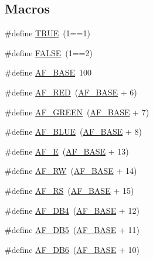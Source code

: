 \subsection*{Macros}
\begin{DoxyCompactItemize}
\item 
\#define \hyperlink{lcd-adafruit_8c_aa8cecfc5c5c054d2875c03e77b7be15d}{T\-R\-U\-E}~(1==1)
\item 
\#define \hyperlink{lcd-adafruit_8c_aa93f0eb578d23995850d61f7d61c55c1}{F\-A\-L\-S\-E}~(1==2)
\item 
\#define \hyperlink{lcd-adafruit_8c_a710181a64fa5dc36dc1ae8186ec077d0}{A\-F\-\_\-\-B\-A\-S\-E}~100
\item 
\#define \hyperlink{lcd-adafruit_8c_a10a331aef88d563a44fc3aca87f67647}{A\-F\-\_\-\-R\-E\-D}~(\hyperlink{lcd-adafruit_8c_a710181a64fa5dc36dc1ae8186ec077d0}{A\-F\-\_\-\-B\-A\-S\-E} + 6)
\item 
\#define \hyperlink{lcd-adafruit_8c_aaf16866710cceb823bc3dd84cd129e5c}{A\-F\-\_\-\-G\-R\-E\-E\-N}~(\hyperlink{lcd-adafruit_8c_a710181a64fa5dc36dc1ae8186ec077d0}{A\-F\-\_\-\-B\-A\-S\-E} + 7)
\item 
\#define \hyperlink{lcd-adafruit_8c_adb7d66e4f10afe077d8eac4be1cb6321}{A\-F\-\_\-\-B\-L\-U\-E}~(\hyperlink{lcd-adafruit_8c_a710181a64fa5dc36dc1ae8186ec077d0}{A\-F\-\_\-\-B\-A\-S\-E} + 8)
\item 
\#define \hyperlink{lcd-adafruit_8c_a7ef1bf47776cd36bfc3a713ee3d1496a}{A\-F\-\_\-\-E}~(\hyperlink{lcd-adafruit_8c_a710181a64fa5dc36dc1ae8186ec077d0}{A\-F\-\_\-\-B\-A\-S\-E} + 13)
\item 
\#define \hyperlink{lcd-adafruit_8c_adb58df064577c4a49af6bf042ac453d2}{A\-F\-\_\-\-R\-W}~(\hyperlink{lcd-adafruit_8c_a710181a64fa5dc36dc1ae8186ec077d0}{A\-F\-\_\-\-B\-A\-S\-E} + 14)
\item 
\#define \hyperlink{lcd-adafruit_8c_a4fb727ea18cfec6c573568e7ebf11e97}{A\-F\-\_\-\-R\-S}~(\hyperlink{lcd-adafruit_8c_a710181a64fa5dc36dc1ae8186ec077d0}{A\-F\-\_\-\-B\-A\-S\-E} + 15)
\item 
\#define \hyperlink{lcd-adafruit_8c_a23452fcd9e29d8032f9acaeaf27389c4}{A\-F\-\_\-\-D\-B4}~(\hyperlink{lcd-adafruit_8c_a710181a64fa5dc36dc1ae8186ec077d0}{A\-F\-\_\-\-B\-A\-S\-E} + 12)
\item 
\#define \hyperlink{lcd-adafruit_8c_a6b13703f0bbcf92f64bf98e1fe583fbe}{A\-F\-\_\-\-D\-B5}~(\hyperlink{lcd-adafruit_8c_a710181a64fa5dc36dc1ae8186ec077d0}{A\-F\-\_\-\-B\-A\-S\-E} + 11)
\item 
\#define \hyperlink{lcd-adafruit_8c_ab403edb026623c84dbe6b9b173c7d858}{A\-F\-\_\-\-D\-B6}~(\hyperlink{lcd-adafruit_8c_a710181a64fa5dc36dc1ae8186ec077d0}{A\-F\-\_\-\-B\-A\-S\-E} + 10)

\end{DoxyCompactItemize}
